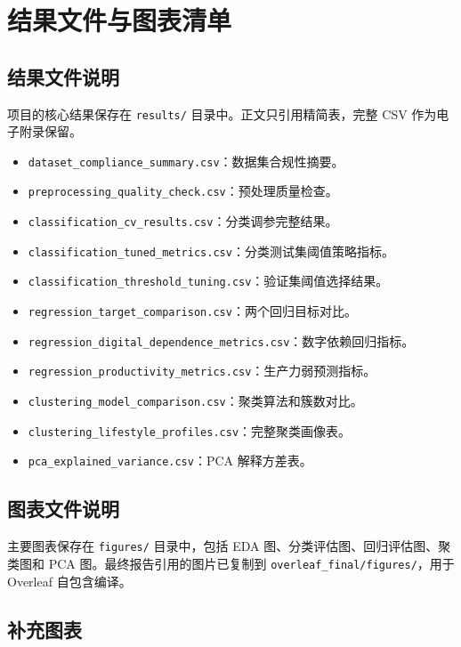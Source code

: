 \chapter{结果文件与图表清单}

\section{结果文件说明}

项目的核心结果保存在 \texttt{results/} 目录中。正文只引用精简表，完整 CSV 作为电子附录保留。

\begin{itemize}
  \item \texttt{dataset\_compliance\_summary.csv}：数据集合规性摘要。
  \item \texttt{preprocessing\_quality\_check.csv}：预处理质量检查。
  \item \texttt{classification\_cv\_results.csv}：分类调参完整结果。
  \item \texttt{classification\_tuned\_metrics.csv}：分类测试集阈值策略指标。
  \item \texttt{classification\_threshold\_tuning.csv}：验证集阈值选择结果。
  \item \texttt{regression\_target\_comparison.csv}：两个回归目标对比。
  \item \texttt{regression\_digital\_dependence\_metrics.csv}：数字依赖回归指标。
  \item \texttt{regression\_productivity\_metrics.csv}：生产力弱预测指标。
  \item \texttt{clustering\_model\_comparison.csv}：聚类算法和簇数对比。
  \item \texttt{clustering\_lifestyle\_profiles.csv}：完整聚类画像表。
  \item \texttt{pca\_explained\_variance.csv}：PCA 解释方差表。
\end{itemize}

\section{图表文件说明}

主要图表保存在 \texttt{figures/} 目录中，包括 EDA 图、分类评估图、回归评估图、聚类图和 PCA 图。最终报告引用的图片已复制到 \texttt{overleaf\_final/figures/}，用于 Overleaf 自包含编译。

\section{补充图表}

